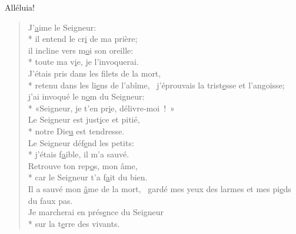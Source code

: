 Alléluia! \\

\begin{verse}
J’\underline{a}ime le Seigneur: \\*
il entend le cr\underline{i} de ma prière; \\
il incline vers m\underline{o}i son oreille: \\*
toute ma v\underline{i}e, je l’invoquerai. \\

J’étais pris dans les filets de la mort, \\*
retenu dans les li\underline{e}ns de l’abîme,~\psalmstar
j’éprouvais la trist\underline{e}sse et l’angoisse; \\
j’ai invoqué le n\underline{o}m du Seigneur: \\*
«Seigneur, je t’en pr\underline{i}e, délivre-moi ! » \\

Le Seigneur est just\underline{i}ce et pitié, \\*
notre Die\underline{u} est tendresse. \\
Le Seigneur déf\underline{e}nd les petits: \\*
j’étais f\underline{a}ible, il m’a sauvé. \\

Retrouve ton rep\underline{o}s, mon âme, \\*
car le Seigneur t’a f\underline{a}it du bien. \\
Il a sauvé mon \underline{â}me de la mort,~\psalmstar
gardé mes yeux des larmes
et mes pi\underline{e}ds du faux pas. \\

Je marcherai en prés\underline{e}nce du Seigneur \\*
sur la t\underline{e}rre des vivants. \\
\end{verse}

